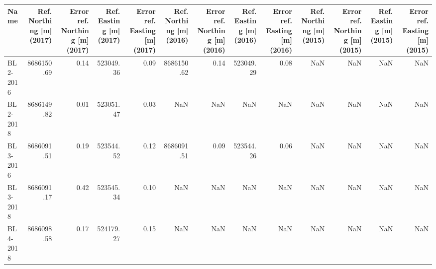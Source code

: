\begin{tabular}{lrrrrrrrrrrrr}
\toprule
        Name &  Ref. Northing [m] (2017) &  Error ref. Northing [m] (2017) &  Ref. Easting [m] (2017) &  Error ref. Easting [m] (2017) &  Ref. Northing [m] (2016) &  Error ref. Northing [m] (2016) &  Ref. Easting [m] (2016) &  Error ref. Easting [m] (2016) &  Ref. Northing [m] (2015) &  Error ref. Northing [m] (2015) &  Ref. Easting [m] (2015) &  Error ref. Easting [m] (2015) \\
\midrule
    BL2-2016 &                8686150.69 &                            0.14 &                523049.36 &                           0.09 &                8686150.62 &                            0.14 &                523049.29 &                           0.08 &                       NaN &                             NaN &                      NaN &                            NaN \\
    BL2-2018 &                8686149.82 &                            0.01 &                523051.47 &                           0.03 &                       NaN &                             NaN &                      NaN &                            NaN &                       NaN &                             NaN &                      NaN &                            NaN \\
    BL3-2016 &                8686091.51 &                            0.19 &                523544.52 &                           0.12 &                8686091.51 &                            0.09 &                523544.26 &                           0.06 &                       NaN &                             NaN &                      NaN &                            NaN \\
    BL3-2018 &                8686091.17 &                            0.42 &                523545.34 &                           0.10 &                       NaN &                             NaN &                      NaN &                            NaN &                       NaN &                             NaN &                      NaN &                            NaN \\
    BL4-2018 &                8686098.58 &                            0.17 &                524179.27 &                           0.15 &                       NaN &                             NaN &                      NaN &                            NaN &                       NaN &                             NaN &                      NaN &                            NaN \\

\end{tabular}
